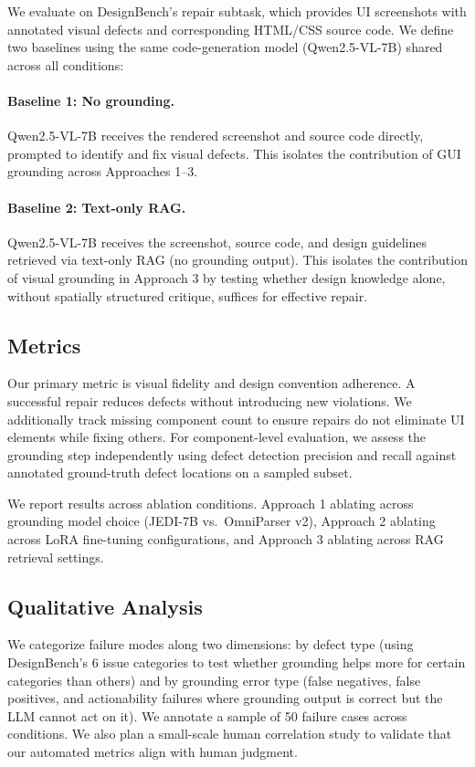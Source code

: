 \documentclass[11pt]{article}
\begin{document}
We evaluate on DesignBench's \cite{designbench2025} repair subtask, which provides UI screenshots with annotated visual defects and corresponding HTML/CSS source code. We define two baselines using the same code-generation model (Qwen2.5-VL-7B) shared across all conditions:

\paragraph{Baseline 1: No grounding.} Qwen2.5-VL-7B receives the rendered screenshot and source code directly, prompted to identify and fix visual defects. This isolates the contribution of GUI grounding across Approaches 1--3.

\paragraph{Baseline 2: Text-only RAG.} Qwen2.5-VL-7B receives the screenshot, source code, and design guidelines retrieved via text-only RAG (no grounding output). This isolates the contribution of visual grounding in Approach 3 by testing whether design knowledge alone, without spatially structured critique, suffices for effective repair.

\subsection{Metrics}

Our primary metric is visual fidelity and design convention adherence. A successful repair reduces defects without introducing new violations. We additionally track missing component count to ensure repairs do not eliminate UI elements while fixing others. For component-level evaluation, we assess the grounding step independently using defect detection precision and recall against annotated ground-truth defect locations on a sampled subset.

We report results across ablation conditions. Approach 1 ablating across grounding model choice (JEDI-7B vs.\ OmniParser v2), Approach 2 ablating across LoRA fine-tuning configurations, and Approach 3 ablating across RAG retrieval settings.

\subsection{Qualitative Analysis}

We categorize failure modes along two dimensions: by defect type (using DesignBench's \cite{designbench2025} 6 issue categories to test whether grounding helps more for certain categories than others) and by grounding error type (false negatives, false positives, and actionability failures where grounding output is correct but the LLM cannot act on it). We annotate a sample of 50 failure cases across conditions. We also plan a small-scale human correlation study to validate that our automated metrics align with human judgment.






\end{document}
